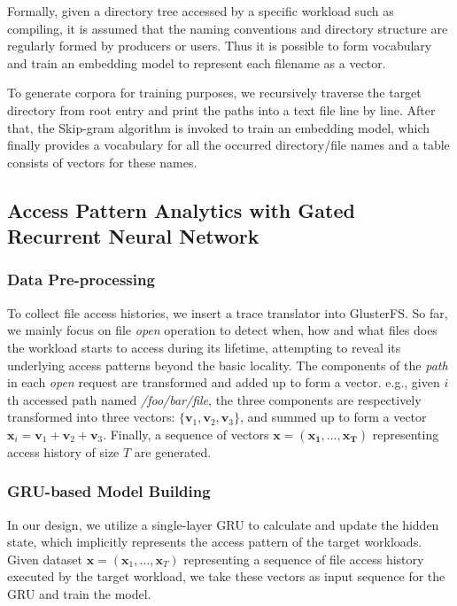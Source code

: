 \documentclass[conference]{IEEEtran}
\begin{document}
Formally, given a directory tree accessed by a specific workload such as compiling, it is assumed that the naming conventions and directory structure are regularly formed by producers or users. Thus it is possible to form vocabulary and train an embedding model to represent each filename as a vector.

To generate corpora for training purposes, we recursively traverse the target directory from root entry and print the paths into a text file line by line. After that, the Skip-gram algorithm is invoked to train an embedding model, which finally provides a vocabulary for all the occurred directory/file names and a table consists of vectors for these names.


\subsection{Access Pattern Analytics with Gated Recurrent Neural Network}
\subsubsection{Data Pre-processing}
To collect file access histories, we insert a trace translator into GlusterFS. So far, we mainly focus on file \textit{open} operation to detect when, how and what files does the workload starts to access during its lifetime, attempting to reveal its underlying access patterns beyond the basic locality. The components of the \textit{path} in each \textit{open} request are transformed and added up to form a vector. e.g., given $i$th accessed path named \textit{/foo/bar/file}, the three components are respectively transformed into three vectors: $\{\mathbf{v}_1, \mathbf{v}_2, \mathbf{v}_3\}$, and summed up to form a vector $\mathbf{x}_i = \mathbf{v}_1 + \mathbf{v}_2 + \mathbf{v}_3$. Finally, a sequence of vectors $\mathbf{x}=(\mathbf{x_1}, \dots, \mathbf{x_T})$ representing access history of size $T$ are generated.

\subsubsection{GRU-based Model Building}
In our design, we utilize a single-layer GRU to calculate and update the hidden state, which implicitly represents the access pattern of the target workloads. Given dataset $\mathbf{x} = (\mathbf{x}_1,\dots,\mathbf{x}_T)$ representing a sequence of file access history executed by the target workload, we take these vectors as input sequence for the GRU and train the model. 
\end{document}
